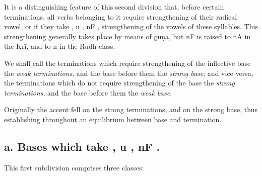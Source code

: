 It is a distinguishing feature of this second division that, before
certain terminations, all verbs belonging to it require strengthening of
their radical vowel, or if they take {\dn {}} , {\dn u} , {\dn nF}
, strengthening of the vowels of these syllables. This
strengthening generally takes place by means of guṇa, but {\dn nF} 
is raised to {\dn nA}  in the Krī, and {\dn {}}  to {\dn n} 
in the Rudh class.

We shall call the terminations which require strengthening of the
inflective base the \emph{weak terminations}, and the base before them
the \emph{strong base}; and vice versa, the terminations which do not
require strengthening of the base the \emph{strong terminations}, and
the base before them the \emph{weak base}.

Originally the accent fell on the strong terminations, and on the strong
base, thus establishing throughout an equilibrium between base and
termination.

\subsection{a. Bases which take {\dn {}} , {\dn u} , {\dn nF}
  .}

\s This first subdivision comprises three classes:

